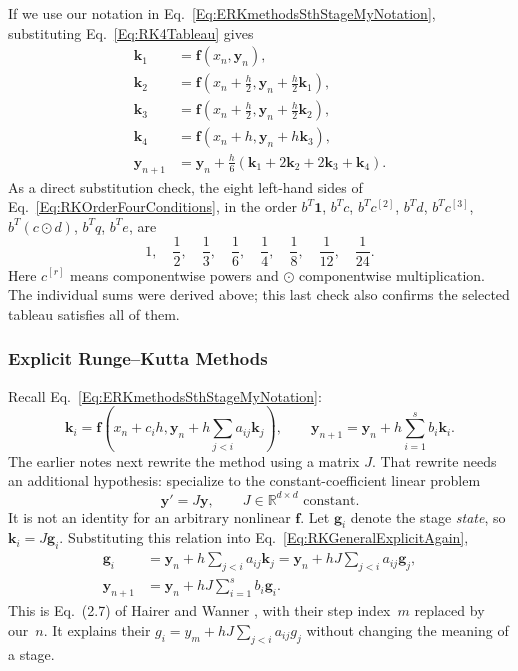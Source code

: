 If we use our notation in Eq.~\ref{Eq:ERKmethodsSthStageMyNotation},
substituting Eq.~\ref{Eq:RK4Tableau} gives
\begin{equation}\label{Eq:RK4ExplicitUpdate}
\begin{aligned}
 \mathbf k_1&=\mathbf f(x_n,\mathbf y_n),\\
 \mathbf k_2&=\mathbf f(x_n+\tfrac h2,\mathbf y_n+\tfrac h2\mathbf k_1),\\
 \mathbf k_3&=\mathbf f(x_n+\tfrac h2,\mathbf y_n+\tfrac h2\mathbf k_2),\\
 \mathbf k_4&=\mathbf f(x_n+h,\mathbf y_n+h\mathbf k_3),\\
 \mathbf y_{n+1}&=\mathbf y_n+\frac h6
       (\mathbf k_1+2\mathbf k_2+2\mathbf k_3+\mathbf k_4).
\end{aligned}
\end{equation}
As a direct substitution check, the eight left-hand sides of
Eq.~\ref{Eq:RKOrderFourConditions}, in the order
$b^T\mathbf1$, $b^Tc$, $b^Tc^{[2]}$, $b^Td$, $b^Tc^{[3]}$,
$b^T(c\odot d)$, $b^Tq$, $b^Te$, are
\[
 1,\quad \frac12,\quad\frac13,\quad\frac16,\quad
 \frac14,\quad\frac18,\quad\frac1{12},\quad\frac1{24}.
\]
Here $c^{[r]}$ means componentwise powers and $\odot$ componentwise
multiplication. The individual sums were derived above; this last check
also confirms the selected tableau satisfies all of them.

\subsubsection{Explicit Runge--Kutta Methods}

Recall Eq.~\ref{Eq:ERKmethodsSthStageMyNotation}:
\begin{equation}\label{Eq:RKGeneralExplicitAgain}
 \mathbf k_i=\mathbf f\left(x_n+c_ih,
                  \mathbf y_n+h\sum_{j<i}a_{ij}\mathbf k_j\right),
 \qquad
 \mathbf y_{n+1}=\mathbf y_n+h\sum_{i=1}^s b_i\mathbf k_i.
\end{equation}
The earlier notes next rewrite the method using a matrix $J$. That rewrite
needs an additional hypothesis: specialize to the constant-coefficient
linear problem
\begin{equation}\label{Eq:RKLinearTestProblem}
 \mathbf y'=J\mathbf y,\qquad J\in\mathbb R^{d\times d}\text{ constant}.
\end{equation}
It is not an identity for an arbitrary nonlinear $\mathbf f$.
Let $\mathbf g_i$ denote the stage \emph{state}, so
$\mathbf k_i=J\mathbf g_i$. Substituting this relation into
Eq.~\ref{Eq:RKGeneralExplicitAgain},
\begin{equation}\label{Eq:RKLinearStageStates}
\begin{aligned}
 \mathbf g_i&=\mathbf y_n+h\sum_{j<i}a_{ij}\mathbf k_j
             =\mathbf y_n+hJ\sum_{j<i}a_{ij}\mathbf g_j,\\
 \mathbf y_{n+1}&=\mathbf y_n+hJ\sum_{i=1}^s b_i\mathbf g_i.
\end{aligned}
\end{equation}
This is Eq.~(2.7) of Hairer and Wanner \cite[Section~IV.2]{HaWa2010},
with their step index~$m$ replaced by our~$n$. It explains their
$g_i=y_m+hJ\sum_{j<i}a_{ij}g_j$ without changing the meaning of a stage.

